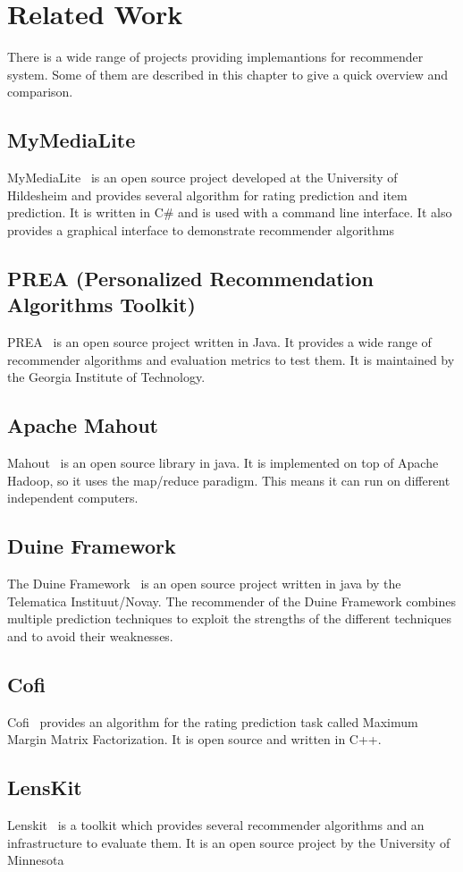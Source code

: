 
\chapter{Related Work}

There is a wide range of projects providing implemantions for recommender
system. Some of them are described in this chapter to give a quick
overview and comparison.


\section{MyMediaLite}

MyMediaLite~\cite{Gantner2011MyMediaLite} is an open source project developed at the
University of Hildesheim and provides several algorithm for rating
prediction and item prediction. It is written in C\# and is used with
a command line interface. It also provides a graphical interface to
demonstrate recommender algorithms


\section{PREA (Personalized Recommendation Algorithms Toolkit)}

PREA~\cite{2012arXiv1205.3193L} is an open source project written in Java. It provides
a wide range of recommender algorithms and evaluation metrics to test
them. It is maintained by the Georgia Institute of Technology.


\section{Apache Mahout}

Mahout~\cite{mahout} is an open source library in java. It is implemented
on top of Apache Hadoop, so it uses the map/reduce paradigm. This
means it can run on different independent computers.


\section{Duine Framework}

The Duine Framework~\cite{duine} is an open source project written
in java by the Telematica Instituut/Novay. The recommender of the
Duine Framework combines multiple prediction techniques to exploit
the strengths of the different techniques and to avoid their weaknesses.


\section{Cofi}

Cofi~\cite{cofi} provides an algorithm for the rating prediction
task called Maximum Margin Matrix Factorization. It is open source
and written in C++.


\section{LensKit}

Lenskit~\cite{Ekstrand:2011:RRR:2043932.2043958} is a toolkit which provides several recommender
algorithms and an infrastructure to evaluate them. It is an open source
project by the University of Minnesota
